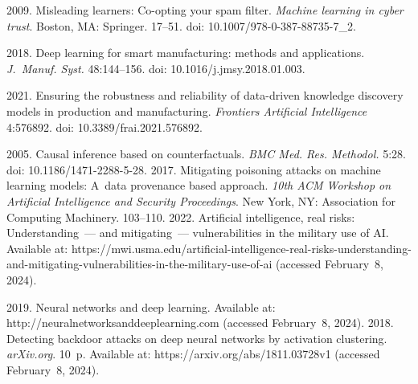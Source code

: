   \begin{multicols}{2}

\renewcommand{\bibname}{\protect\rmfamily References}

{\small\frenchspacing
 {%
 \begin{thebibliography}{99} 
 
 2009. Misleading learners: Co-opting your spam filter. 
\textit{Machine learning in cyber trust}. Boston, MA: Springer. 17--51. doi: 
10.1007/978-0-387-88735-7\_2.

 2018. Deep learning for 
smart manufacturing: methods and applications. \textit{J.~Manuf. Syst.} 48:144--156. 
doi: 10.1016/j.jmsy.2018.01.003.

 2021. Ensuring the robustness and reliability of data-driven 
knowledge discovery models in production and manufacturing. \textit{Frontiers Artificial 
Intelligence} 4:576892. doi: 10.3389/frai.2021.576892.

 2005. Causal inference based on counterfactuals. 
\textit{BMC Med. Res. Methodol.} 5:28. doi: 10.1186/1471-2288-5-28.
 2017. Mitigating 
poisoning attacks on machine learning models: A~data provenance based approach. 
\textit{10th ACM Workshop on Artificial Intelligence and Security Proceedings}. New 
York, NY: Association for Computing Machinery. 103--110.
 2022. Artificial intelligence, real 
risks: Understanding~--- and mitigating~--- vulnerabilities in the military use of AI. 
Available at: {\sf  
https://mwi.usma.edu/artificial-intelligence-real-risks-understanding-and-mitigating-vulnerabilities-in-the-military-use-of-ai} (accessed February~8, 
2024).

 2019. Neural networks and deep learning. Available at: {\sf 
http://neuralnetworksanddeeplearning.com} (accessed February~8, 2024).
 2018. Detecting backdoor attacks on deep neural 
networks by activation clustering. \textit{arXiv.org}. 10~p. Available at: {\sf 
https://arxiv.org/abs/1811.03728v1} (accessed February~8, 2024).


\end{thebibliography}}}
\end{multicols}
